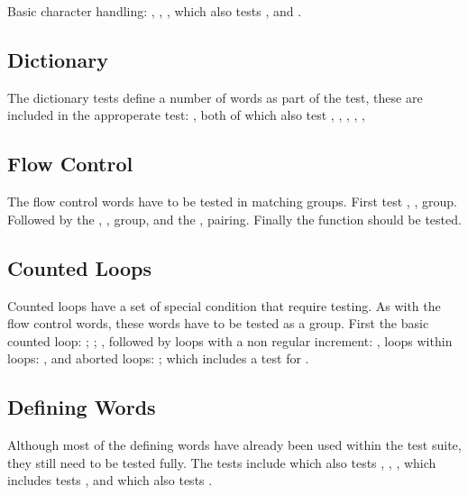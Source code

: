 Basic character handling:
	,
	,
	,
	\tref{core:[}{[} which also tests \word{]}, and
	.

\subsection{Dictionary}

The dictionary tests define a number of words as part of the test,
these are included in the approperate test:
	,
	 both of which also test ,
	,
	,
	,
	,

\subsection{Flow Control}

The flow control words have to be tested in matching groups.
First test , ,  group.
Followed by the , ,
 group, and the , 
pairing.  Finally the  function should
be tested.

\subsection{Counted Loops}

Counted loops have a set of special condition that require testing.
As with the flow control words, these words have to be tested as
a group.
First the basic counted loop: ; ;
	,
followed by loops with a non regular increment:
	,
loops within loops:
	,
and aborted loops:
	;
	 which includes a test for .

\subsection{Defining Words}

Although most of the defining words have already been used within the
test suite, they still need to be tested fully.  The tests include
	 which also tests \word{;},
	,
	,
	 which includes tests , and
	 which also tests .


